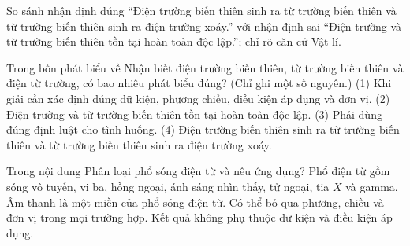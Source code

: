 \begin{bt}
So sánh nhận định đúng “Điện trường biến thiên sinh ra từ trường biến thiên và từ trường biến thiên sinh ra điện trường xoáy.” với nhận định sai “Điện trường và từ trường biến thiên tồn tại hoàn toàn độc lập.”; chỉ rõ căn cứ Vật lí.
\end{bt}

\begin{ex}
Trong bốn phát biểu về Nhận biết điện trường biến thiên, từ trường biến thiên và điện từ trường, có bao nhiêu phát biểu đúng? (Chỉ ghi một số nguyên.) (1) Khi giải cần xác định đúng dữ kiện, phương chiều, điều kiện áp dụng và đơn vị. (2) Điện trường và từ trường biến thiên tồn tại hoàn toàn độc lập. (3) Phải dùng đúng định luật cho tình huống. (4) Điện trường biến thiên sinh ra từ trường biến thiên và từ trường biến thiên sinh ra điện trường xoáy.
\end{ex}

\begin{ex}
Trong nội dung Phân loại phổ sóng điện từ và nêu ứng dụng?
\choice
{\True Phổ điện từ gồm sóng vô tuyến, vi ba, hồng ngoại, ánh sáng nhìn thấy, tử ngoại, tia $X$ và gamma.}
{Âm thanh là một miền của phổ sóng điện từ.}
{Có thể bỏ qua phương, chiều và đơn vị trong mọi trường hợp.}
{Kết quả không phụ thuộc dữ kiện và điều kiện áp dụng.}
\end{ex}

